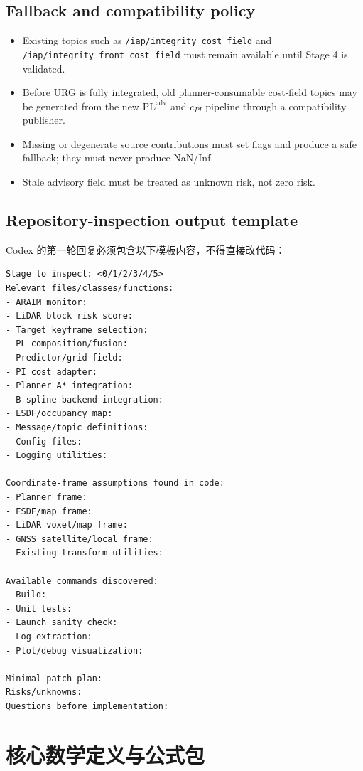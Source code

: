 \documentclass[11pt,a4paper]{article}
\newcommand{\PL}{\mathrm{PL}}
\newcommand{\adv}{\mathrm{adv}}
\begin{document}
\subsection{Fallback and compatibility policy}

\begin{itemize}
  \item Existing topics such as \texttt{/iap/integrity\_cost\_field} and \texttt{/iap/integrity\_front\_cost\_field} must remain available until Stage 4 is validated.
  \item Before URG is fully integrated, old planner-consumable cost-field topics may be generated from the new $\PL^{\adv}$ and $c_{PI}$ pipeline through a compatibility publisher.
  \item Missing or degenerate source contributions must set flags and produce a safe fallback; they must never produce NaN/Inf.
  \item Stale advisory field must be treated as unknown risk, not zero risk.
\end{itemize}

\subsection{Repository-inspection output template}

Codex 的第一轮回复必须包含以下模板内容，不得直接改代码：
\begin{lstlisting}
Stage to inspect: <0/1/2/3/4/5>
Relevant files/classes/functions:
- ARAIM monitor:
- LiDAR block risk score:
- Target keyframe selection:
- PL composition/fusion:
- Predictor/grid field:
- PI cost adapter:
- Planner A* integration:
- B-spline backend integration:
- ESDF/occupancy map:
- Message/topic definitions:
- Config files:
- Logging utilities:

Coordinate-frame assumptions found in code:
- Planner frame:
- ESDF/map frame:
- LiDAR voxel/map frame:
- GNSS satellite/local frame:
- Existing transform utilities:

Available commands discovered:
- Build:
- Unit tests:
- Launch sanity check:
- Log extraction:
- Plot/debug visualization:

Minimal patch plan:
Risks/unknowns:
Questions before implementation:
\end{lstlisting}

\section{核心数学定义与公式包}
\end{document}
